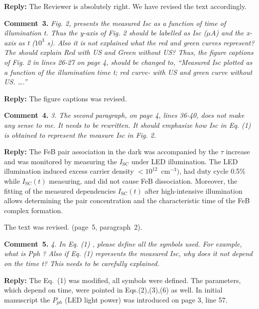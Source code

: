 \documentclass[sn-mathphys]{sn-jnl}
\begin{document}
\noindent
\textcolor[rgb]{0.51,0.00,0.00}{\textbf{Reply:}}
The Reviewer is absolutely right. We have revised the text accordingly.

\vspace{1cm}
\noindent
\textcolor[rgb]{0.00,0.50,1.00}{\textbf{Comment~3.}}
\emph{Fig. 2, presents the measured Isc as a function of time of illumination t.
Thus the y-axis of Fig. 2 should be labelled as Isc ($\mu$A) and the x-axis as t ($10^3$ s).
Also it is not explained what the red and green curves represent?
The should explain Red with US and Green without US?
Thus, the figure captions of Fig. 2 in lines 26-27 on page 4, should be changed to, “Measured Isc plotted as a function of the illumination time t; red curve- with US and green curve without US. ….”}

\noindent
\textcolor[rgb]{0.51,0.00,0.00}{\textbf{Reply:}}
The figure captions was revised.


\vspace{1cm}
\noindent
\textcolor[rgb]{0.00,0.50,1.00}{\textbf{Comment~4.}}
\emph{3.	The second paragraph, on page 4, lines 36-40, does not make any sense to me.
It needs to be rewritten.
It should emphasize how Isc in Eq. (1) is obtained to represent the measure Isc in Fig. 2.}

\noindent
\textcolor[rgb]{0.51,0.00,0.00}{\textbf{Reply:}}
The FeB pair association in the dark was accompanied by the $\tau$ increase and
was monitored by measuring the $I_\mathrm{SC}$ under LED illumination.
The LED illumination induced excess carrier density $<10^{12}$~cm$^{-3})$,
had duty cycle 0.5\% while $I_\mathrm{SC}(t)$ measuring,
and did not cause FeB dissociation.
Moreover, the fitting of the measured dependencies $I_\mathrm{SC}(t)$ after high-intensive illumination
allows determining  the pair concentration and the characteristic time of the FeB complex formation.


The text was revised.
(page~5, paragraph~2).

\vspace{1cm}
\noindent
\textcolor[rgb]{0.00,0.50,1.00}{\textbf{Comment~5.}}
\emph{4.	In Eq. (1) , please define all the symbols used. For example, what is Pph ?
Also if Eq. (1) represents the measured Isc, why does it not depend on the time t?
This needs to be carefully explained.}

\noindent
\textcolor[rgb]{0.51,0.00,0.00}{\textbf{Reply:}}
The Eq.~(1) was modified,
all symbols were defined.
The parameters, which depend on time, were pointed in Eqs.(2),(3),(6) as well.
In initial manuscript the $P_{ph}$ (LED light power) was introduced on page 3, line 57.
\end{document}
